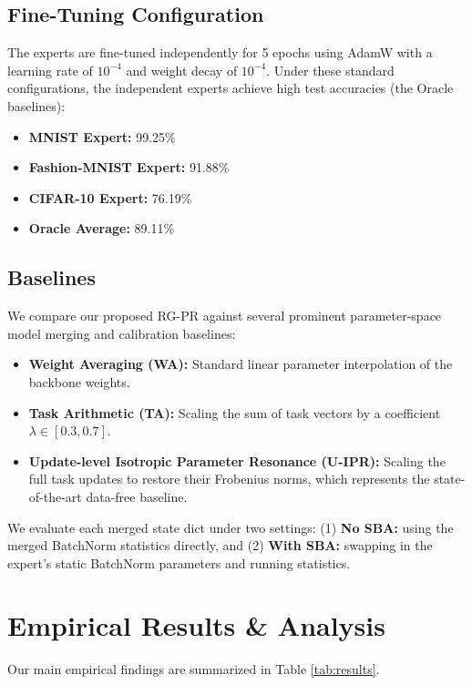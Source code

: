 \documentclass{article}
\theoremstyle{plain}
\theoremstyle{definition}
\theoremstyle{remark}
\begin{document}
\subsection{Fine-Tuning Configuration}
The experts are fine-tuned independently for 5 epochs using AdamW with a learning rate of $10^{-4}$ and weight decay of $10^{-4}$. Under these standard configurations, the independent experts achieve high test accuracies (the Oracle baselines):
\begin{itemize}
    \item \textbf{MNIST Expert:} 99.25\%
    \item \textbf{Fashion-MNIST Expert:} 91.88\%
    \item \textbf{CIFAR-10 Expert:} 76.19\%
    \item \textbf{Oracle Average:} 89.11\%
\end{itemize}

\subsection{Baselines}
We compare our proposed RG-PR against several prominent parameter-space model merging and calibration baselines:
\begin{itemize}
    \item \textbf{Weight Averaging (WA):} Standard linear parameter interpolation of the backbone weights.
    \item \textbf{Task Arithmetic (TA):} Scaling the sum of task vectors by a coefficient $\lambda \in [0.3, 0.7]$.
    \item \textbf{Update-level Isotropic Parameter Resonance (U-IPR):} Scaling the full task updates to restore their Frobenius norms, which represents the state-of-the-art data-free baseline.
\end{itemize}
We evaluate each merged state dict under two settings: (1) \textbf{No SBA:} using the merged BatchNorm statistics directly, and (2) \textbf{With SBA:} swapping in the expert's static BatchNorm parameters and running statistics.

\section{Empirical Results \& Analysis}
\label{sec:results}

Our main empirical findings are summarized in Table \ref{tab:results}.
\end{document}
